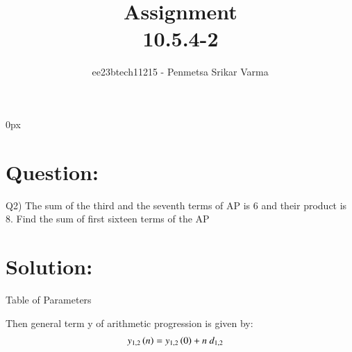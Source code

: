 \documentclass[beamer]{IEEEtran}
\theoremstyle{remark}
\begin{document}
\parindent 0px


\title{Assignment\\[1ex]10.5.4-2}
\author{ee23btech11215 - Penmetsa Srikar Varma$^{}$%
}
\maketitle
\newpage
\bigskip

\renewcommand{\thefigure}{\theenumi}
\renewcommand{\thetable}{\theenumi}
\section*{Question:}
Q2) The sum of the third and the seventh terms of AP is 6 and their product is 8. Find the sum of first sixteen terms of the AP\\
\section*{Solution:}
{
\centering
Table of Parameters\\
}
\begin{table}[h]
    \centering
    
    \label{table of parameters}
\end{table}

Then general term y of arithmetic progression is given by:
\begin{align}
\label{q1}
y_{1,2}\left(n\right)&=y_{1,2}\left(0\right)+n\ d_{1,2}
\end{align}
 
\end{document}
